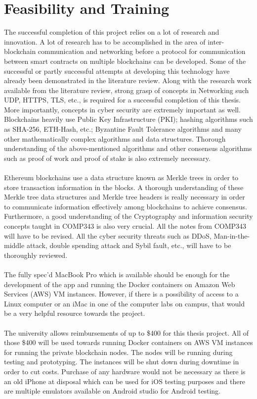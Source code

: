 \documentclass[a4paper,twoside,phd]{BYUPhys}
\begin{document}
\section{Feasibility and Training}
The successful completion of this project relies on a lot of research and innovation. A lot of research has to be accomplished in the area of inter-blockchain communication and networking before a protocol for communication between smart contracts on multiple blockchains can be developed. Some of the successful or partly successful attempts at developing this technology have already been demonstrated in the literature review. Along with the research work available from the literature review, strong grasp of concepts in Networking such UDP, HTTPS, TLS, etc., is required for a successful completion of this thesis. More importantly, concepts in cyber security are extremely important as well. Blockchains heavily use Public Key Infrastructure (PKI); hashing algorithms such as SHA-256, ETH-Hash, etc.; Byzantine Fault Tolerance algorithms and many other mathematically complex algorithms and data structures. Thorough understanding of the above-mentioned algorithms and other consensus algorithms such as proof of work and proof of stake is also extremely necessary.
\\
\\
Ethereum blockchains use a data structure known as Merkle trees in order to store transaction information in the blocks. A thorough understanding of these Merkle tree data structures and Merkle tree headers is really necessary in order to communicate information effectively among blockchains to achieve consensus. Furthermore, a good understanding of the Cryptography and information security concepts taught in COMP343 is also very crucial. All the notes from COMP343 will have to be revised. All the cyber security threats such as DDoS, Man-in-the- middle attack, double spending attack and Sybil fault, etc., will have to be thoroughly reviewed.
\\
\\
The fully spec’d MacBook Pro which is available should be enough for the development of the app and running the Docker containers on Amazon Web Services (AWS) VM instances. However, if there is a possibility of access to a Linux computer or an iMac in one of the computer labs on campus, that would be a very helpful resource towards the project.
\\
\\
The university allows reimbursements of up to \$400 for this thesis project. All of those \$400 will be used towards running Docker containers on AWS VM instances for running the private blockchain nodes. The nodes will be running during testing and prototyping. The instances will be shut down during downtime in order to cut costs. Purchase of any hardware would not be necessary as there is an old iPhone at disposal which can be used for iOS testing purposes and there are multiple emulators available on Android studio for Android testing.
\end{document}
